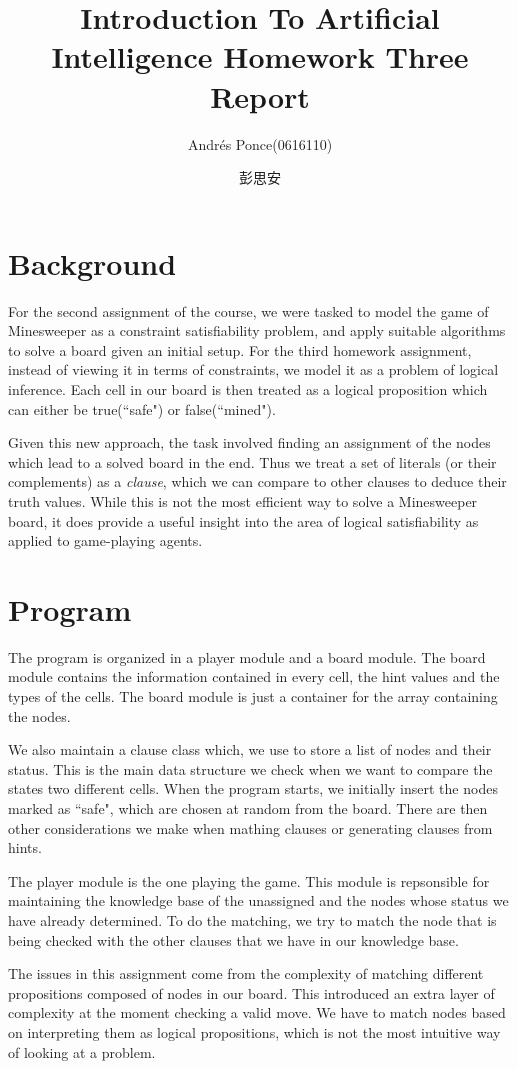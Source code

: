 \documentclass{article}
\author{Andr\'es Ponce(0616110)\\
\and
彭思安
}
\title{Introduction To Artificial Intelligence Homework Three Report}
\begin{document}
\maketitle
\section{Background}
For the second assignment of the course, we were tasked to model the game of Minesweeper as a 
constraint satisfiability problem, and apply suitable algorithms to solve a board given an initial 
setup. For the third homework assignment, instead of viewing it in terms of constraints, we model it
as a problem of logical inference. Each cell in our board is then treated as a logical proposition
which can either be true(``safe") or false(``mined").

Given this new approach, the task involved finding an assignment of the nodes which lead to a solved 
board in the end. Thus we treat a set of literals (or their complements) as a \textit{clause}, which
we can compare to other clauses to deduce their truth values. While this is not the most efficient
way to solve a Minesweeper board, it does provide a useful insight into the area of logical satisfiability
as applied to game-playing agents.

\section{Program}
The program is organized in a player module and a board module. The board module contains the information 
contained in every cell, the hint values and the types of the cells. The board module is just a container
for the array containing the nodes.

We also maintain a clause class which, we use to store a list of nodes and their status. This is the main
data structure we check when we want to compare the states two different cells. When the program starts, 
we initially insert the nodes marked as ``safe", which are chosen at random from the board. There are
then other considerations we make when mathing clauses or generating clauses from hints.

The player module is the one playing the game. This module is repsonsible for maintaining the knowledge
base of the unassigned and the nodes whose status we have already determined. To do the matching, we 
try to match the node that is being checked with the other clauses that we have in our knowledge base.

The issues in this assignment come from the complexity of matching different propositions composed of nodes in our board. This introduced an extra layer of
complexity at the moment checking a valid move. We have to match nodes based on 
interpreting them as logical propositions, which is not the most intuitive way
of looking at a problem.
\end{document}
